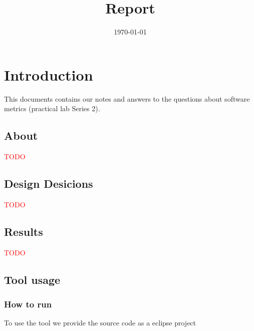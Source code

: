 \documentclass{uva-inf-article}
\title{Report}
\date{\today}
\newcommand\todo[1]{\textcolor{red}{#1}}
\begin{document}
\maketitle




\section{Introduction}

This documents contains our notes and answers to the questions about
software metrics (practical lab Series 2).


\subsection{About}

\todo{TODO}


\subsection{Design Desicions}

\todo{TODO}


\subsection{Results}

\todo{TODO}


\subsection{Tool usage}


\subsubsection{How to run}

To use the tool we provide the source code as a eclipse project
\end{document}
